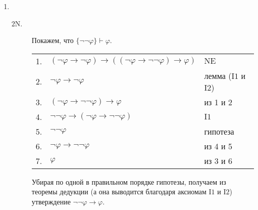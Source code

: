 \documentclass[12pt,a4paper]{article}
\begin{document}
\begin{enumproblem}
\begin{enumerate}
            \item\ 
                \begin{description}
                    \item[\underline{$\mathrm{2N}$}.] Покажем, что $\{\neg \neg \varphi\} \vdash \varphi$.
                        \begin{center}
                            \begin{tabular}{rll}
                                1.& $(\neg \varphi \rightarrow \neg \varphi) \rightarrow ((\neg \varphi \rightarrow \neg \neg \varphi) \rightarrow \varphi)$& $\mathrm{NE}$\\
                                2.& $\neg \varphi \rightarrow \neg \varphi$& лемма ($\mathrm{I1}$ и $\mathrm{I2}$)\\
                                3.& $(\neg \varphi \rightarrow \neg \neg \varphi) \rightarrow \varphi$& из 1 и 2\\
                                4.& $\neg \neg \varphi \rightarrow (\neg \varphi \rightarrow \neg \neg \varphi)$& $\mathrm{I1}$\\
                                5.& $\neg \neg \varphi$& гипотеза\\
                                6.& $\neg \varphi \rightarrow \neg \neg \varphi$& из 4 и 5\\
                                7.& $\varphi$& из 3 и 6\\
                            \end{tabular}
                        \end{center}
                        Убирая по одной в правильном порядке гипотезы, получаем из теоремы дедукции (а она выводится благодаря аксиомам $\mathrm{I1}$ и $\mathrm{I2}$) утверждение $\neg \neg \varphi \rightarrow \varphi$.
                    

\end{description}
\end{enumerate}
\end{enumproblem}
\end{document}
